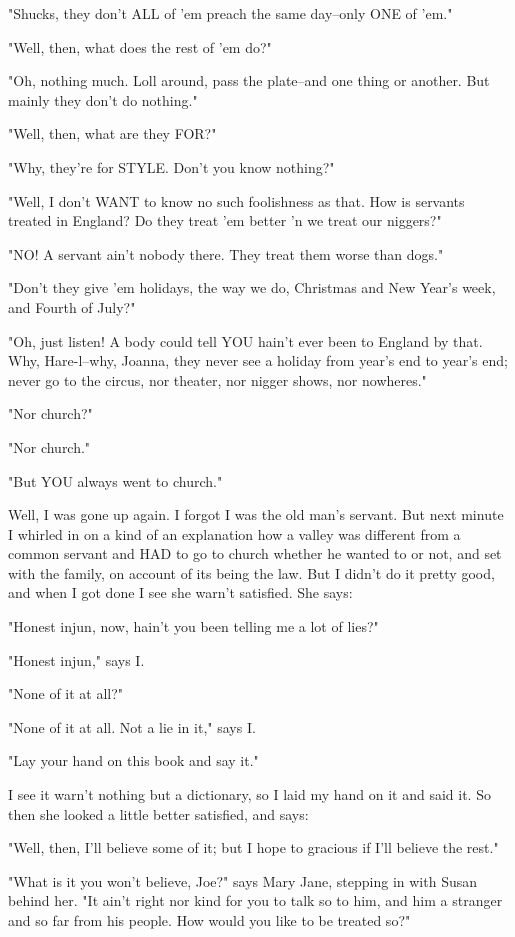 "Shucks, they don't ALL of 'em preach the same day--only ONE of 'em."

"Well, then, what does the rest of 'em do?"

"Oh, nothing much.  Loll around, pass the plate--and one thing or
another.  But mainly they don't do nothing."

"Well, then, what are they FOR?"

"Why, they're for STYLE.  Don't you know nothing?"

"Well, I don't WANT to know no such foolishness as that.  How is servants
treated in England?  Do they treat 'em better 'n we treat our niggers?"

"NO!  A servant ain't nobody there.  They treat them worse than dogs."

"Don't they give 'em holidays, the way we do, Christmas and New Year's
week, and Fourth of July?"

"Oh, just listen!  A body could tell YOU hain't ever been to England by
that.  Why, Hare-l--why, Joanna, they never see a holiday from year's end
to year's end; never go to the circus, nor theater, nor nigger shows, nor
nowheres."

"Nor church?"

"Nor church."

"But YOU always went to church."

Well, I was gone up again.  I forgot I was the old man's servant.  But
next minute I whirled in on a kind of an explanation how a valley was
different from a common servant and HAD to go to church whether he wanted
to or not, and set with the family, on account of its being the law.  But
I didn't do it pretty good, and when I got done I see she warn't
satisfied.  She says:

"Honest injun, now, hain't you been telling me a lot of lies?"

"Honest injun," says I.

"None of it at all?"

"None of it at all.  Not a lie in it," says I.

"Lay your hand on this book and say it."

I see it warn't nothing but a dictionary, so I laid my hand on it and
said it.  So then she looked a little better satisfied, and says:

"Well, then, I'll believe some of it; but I hope to gracious if I'll
believe the rest."

"What is it you won't believe, Joe?" says Mary Jane, stepping in with
Susan behind her.  "It ain't right nor kind for you to talk so to him,
and him a stranger and so far from his people.  How would you like to be
treated so?"

